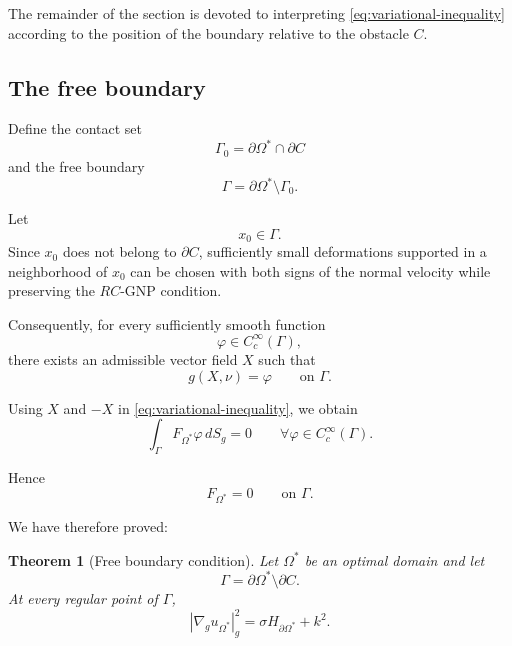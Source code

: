 \documentclass{article}
\renewcommand{\boxed}[1]{#1}
\newtheorem{theorem}{Theorem}[section]
\begin{document}
The remainder of the section is devoted to interpreting
\eqref{eq:variational-inequality} according to the position of the
boundary relative to the obstacle $C$.


\subsection{The free boundary}
\label{subsec:free-boundary-optimality}

Define the contact set
\begin{equation}
\Gamma_0
=
\partial\Omega^\ast\cap\partial C
\label{eq:Gamma0}
\end{equation}
and the free boundary
\begin{equation}
\Gamma
=
\partial\Omega^\ast\setminus\Gamma_0.
\label{eq:Gamma}
\end{equation}

Let
\[
x_0\in\Gamma.
\]
Since $x_0$ does not belong to $\partial C$, sufficiently small
deformations supported in a neighborhood of $x_0$ can be chosen with
both signs of the normal velocity while preserving the
$RC$-GNP condition.

Consequently, for every sufficiently smooth function
\[
\varphi\in C_c^\infty(\Gamma),
\]
there exists an admissible vector field $X$ such that
\[
g(X,\nu)=\varphi
\qquad\text{on }\Gamma.
\]

Using $X$ and $-X$ in
\eqref{eq:variational-inequality}, we obtain
\begin{equation}
\int_\Gamma
F_{\Omega^\ast}\varphi\,dS_g
=
0
\qquad
\forall\varphi\in C_c^\infty(\Gamma).
\end{equation}

Hence
\begin{equation}
F_{\Omega^\ast}=0
\qquad\text{on }\Gamma.
\end{equation}

We have therefore proved:

\begin{theorem}[Free boundary condition]
\label{thm:free-boundary-optimality}
Let $\Omega^\ast$ be an optimal domain and let
\[
\Gamma=\partial\Omega^\ast\setminus\partial C.
\]
At every regular point of $\Gamma$,
\begin{equation}
\boxed{
|\nabla_g u_{\Omega^\ast}|_g^2
=
\sigma H_{\partial\Omega^\ast}
+k^2.
}
\label{eq:free-boundary-equality}
\end{equation}
\end{theorem}
\end{document}
